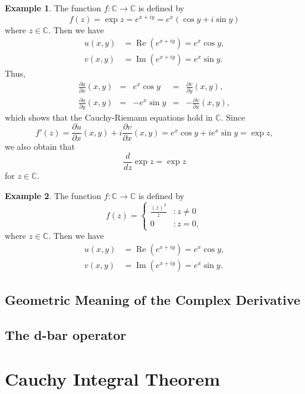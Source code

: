 \documentclass[12pt,openany]{book}
\theoremstyle{definition}
\newtheorem{example}{Example}[section]
\newcommand{\C}{\mathbb{C}}
\newcommand{\of}[1]{\left( #1 \right)}
\renewcommand{\Re}{\operatorname{Re}}
\renewcommand{\Im}{\operatorname{Im}}
\begin{document}
	\newpage
	\begin{example}
		The function $f:\C\to\C$ is defined by \[
		f\of{z}=\exp z=e^{x+iy}=e^x\of{\cos y+i\sin y}
		\] where $z\in\C$. Then we have \begin{align*}
			u(x,y)&=\Re\of{e^{x+iy}}=e^x\cos y,\\
			v(x,y)&=\Im\of{e^{x+iy}}=e^x\sin y.
		\end{align*} Thus, \begin{align*}
			\frac{\partial u}{\partial x}\of{x,y} &=& e^x\cos y &=& \frac{\partial v}{\partial y}\of{x,y},\\
			\frac{\partial u}{\partial y}\of{x,y} &=& -e^x\sin y &=& -\frac{\partial v}{\partial x}\of{x,y},
		\end{align*} which shows that the Cauchy-Riemann equations hold in $\C$. Since \[
		f'\of{z}=\frac{\partial u}{\partial x}\of{x,y}+i\frac{\partial v}{\partial x}\of{x,y}=e^x\cos y+ie^x\sin y=\exp z,
		\] we also obtain that \[
		\frac{d}{dz}\exp z=\exp z
		\] for $z\in\C$.
	\end{example}
	
	\begin{example}
		The function $f:\C\to\C$ is defined by \[
		f\of{z}=\begin{cases}
			\displaystyle\frac{\of{\bar{z}}^2}{z} &:z\neq 0\\
			0 &:z=0,
		\end{cases}
		\] where $z\in\C$. Then we have \begin{align*}
			u(x,y)&=\Re\of{e^{x+iy}}=e^x\cos y,\\
			v(x,y)&=\Im\of{e^{x+iy}}=e^x\sin y.
		\end{align*}
	\end{example}
	
	\newpage
	\section{Geometric Meaning of the Complex Derivative}
	
	\newpage
	\section{The d-bar operator}
	
	\newpage
	\chapter{Cauchy Integral Theorem}
	
\end{document}
